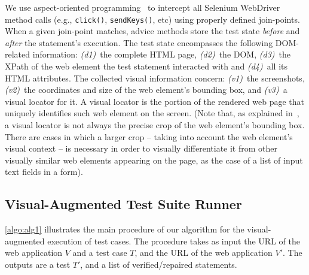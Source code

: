 
We use aspect-oriented programming~\cite{aop} to intercept all Selenium WebDriver method calls (e.g., \texttt{click()}, \texttt{sendKeys()}, etc) using properly defined join-points. When a given join-point matches, advice methods store the test state \textit{before} and \textit{after} the statement's execution. The test state encompasses the following DOM-related information: \textit{(d1)}~the complete HTML page, \textit{(d2)}~the DOM, \textit{(d3)}~the XPath of the web element the test statement interacted with and \textit{(d4)}~all its HTML attributes. The collected visual information concern: \textit{(v1)}~the screenshots, \textit{(v2)}~the coordinates and size of the web element's bounding box, and \textit{(v3)}~a visual locator for it. A visual locator is the portion of the rendered web page that uniquely identifies such web element on the screen. (Note that, as explained in~\cite{2014-Stocco-SCAM,2015-Leotta-SAC}, a visual locator is not always the precise crop of the web element's bounding box. There are cases in which a larger crop -- taking into account the web element's visual context --  is necessary in order to visually differentiate it from other visually similar web elements appearing on the page, as the case of a list of input text fields in a form).

\subsection{Visual-Augmented Test Suite Runner}

\autoref{algo:alg1} illustrates the main procedure of our algorithm for the visual-augmented execution of test cases. The procedure takes as input the URL of the web application $V$ and a test case $T$, and the URL of the web application $V'$. The outputs are a test $T'$, and a list of verified/repaired statements. 

